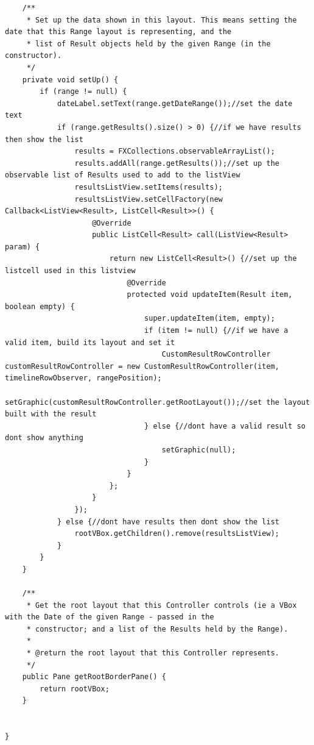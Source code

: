 \begin{lstlisting}
    /**
     * Set up the data shown in this layout. This means setting the date that this Range layout is representing, and the
     * list of Result objects held by the given Range (in the constructor).
     */
    private void setUp() {
        if (range != null) {
            dateLabel.setText(range.getDateRange());//set the date text
            if (range.getResults().size() > 0) {//if we have results then show the list
                results = FXCollections.observableArrayList();
                results.addAll(range.getResults());//set up the observable list of Results used to add to the listView
                resultsListView.setItems(results);
                resultsListView.setCellFactory(new Callback<ListView<Result>, ListCell<Result>>() {
                    @Override
                    public ListCell<Result> call(ListView<Result> param) {
                        return new ListCell<Result>() {//set up the listcell used in this listview
                            @Override
                            protected void updateItem(Result item, boolean empty) {
                                super.updateItem(item, empty);
                                if (item != null) {//if we have a valid item, build its layout and set it
                                    CustomResultRowController customResultRowController = new CustomResultRowController(item, timelineRowObserver, rangePosition);
                                    setGraphic(customResultRowController.getRootLayout());//set the layout built with the result
                                } else {//dont have a valid result so dont show anything
                                    setGraphic(null);
                                }
                            }
                        };
                    }
                });
            } else {//dont have results then dont show the list
                rootVBox.getChildren().remove(resultsListView);
            }
        }
    }

    /**
     * Get the root layout that this Controller controls (ie a VBox with the Date of the given Range - passed in the
     * constructor; and a list of the Results held by the Range).
     *
     * @return the root layout that this Controller represents.
     */
    public Pane getRootBorderPane() {
        return rootVBox;
    }


}
\end{lstlisting}
